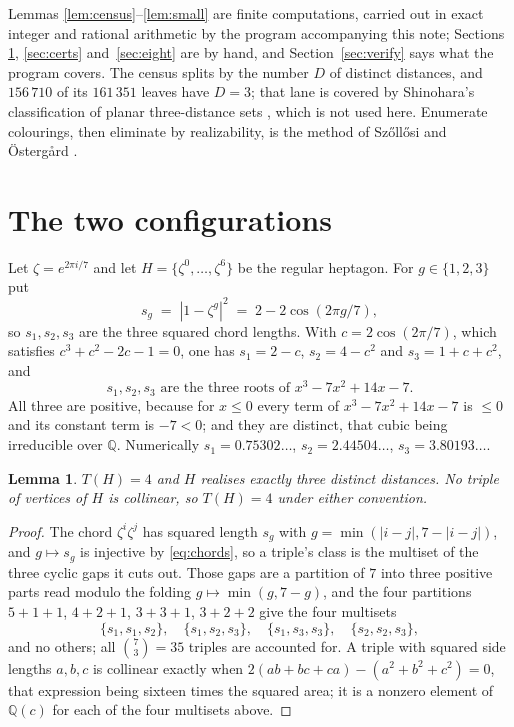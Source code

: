 \documentclass[11pt]{amsart}
\numberwithin{theorem}{section}
\newtheorem{lemma}[theorem]{Lemma}
\theoremstyle{remark}
\theoremstyle{definition}
\newcommand{\Tcount}{T}
\begin{document}
Lemmas \ref{lem:census}--\ref{lem:small} are finite computations, carried out in
exact integer and rational arithmetic by the program accompanying this note;
Sections \ref{sec:objects}, \ref{sec:certs} and~\ref{sec:eight} are by hand, and
Section~\ref{sec:verify} says what the program covers. The census splits by the
number $D$ of distinct distances, and $156\,710$ of its $161\,351$ leaves have
$D=3$; that lane is covered by Shinohara's classification of planar
three-distance sets \cite{Shinohara}, which is not used here. Enumerate
colourings, then eliminate by realizability, is the method of Sz\H{o}ll\H{o}si
and \"Osterg\aa rd \cite{SO}.

\section{The two configurations}\label{sec:objects}

Let $\zeta=e^{2\pi i/7}$ and let $H=\{\zeta^0,\dots,\zeta^6\}$ be the regular
heptagon. For $g\in\{1,2,3\}$ put
\[
  s_g \;=\; |1-\zeta^g|^2 \;=\; 2-2\cos(2\pi g/7),
\]
so $s_1,s_2,s_3$ are the three squared chord lengths. With $c=2\cos(2\pi/7)$,
which satisfies $c^3+c^2-2c-1=0$, one has $s_1=2-c$, $s_2=4-c^2$ and
$s_3=1+c+c^2$, and
\begin{equation}\label{eq:chords}
  s_1,s_2,s_3 \text{ are the three roots of } x^3-7x^2+14x-7 .
\end{equation}
All three are positive, because for $x\le 0$ every term of $x^3-7x^2+14x-7$ is
$\le 0$ and its constant term is $-7<0$; and they are distinct, that cubic being
irreducible over $\mathbb Q$. Numerically
$s_1=0.75302\ldots$, $s_2=2.44504\ldots$, $s_3=3.80193\ldots$.

\begin{lemma}\label{lem:heptagon}
$\Tcount(H)=4$ and $H$ realises exactly three distinct distances. No triple of
vertices of $H$ is collinear, so $\Tcount(H)=4$ under either convention.
\end{lemma}

\begin{proof}
The chord $\zeta^i\zeta^j$ has squared length $s_g$ with
$g=\min(|i-j|,7-|i-j|)$, and $g\mapsto s_g$ is injective by \eqref{eq:chords},
so a triple's class is the multiset of the three cyclic gaps it cuts out. Those
gaps are a partition of $7$ into three positive parts read modulo the folding
$g\mapsto\min(g,7-g)$, and the four partitions $5{+}1{+}1$, $4{+}2{+}1$,
$3{+}3{+}1$, $3{+}2{+}2$ give the four multisets
\[
  \{s_1,s_1,s_2\},\quad \{s_1,s_2,s_3\},\quad \{s_1,s_3,s_3\},\quad
  \{s_2,s_2,s_3\},
\]
and no others; all $\binom73=35$ triples are accounted for. A triple with
squared side lengths $a,b,c$ is collinear exactly when
$2(ab+bc+ca)-(a^2+b^2+c^2)=0$, that expression being sixteen times the squared
area; it is a nonzero element of $\mathbb Q(c)$ for each of the four multisets
above.
\end{proof}
\end{document}
